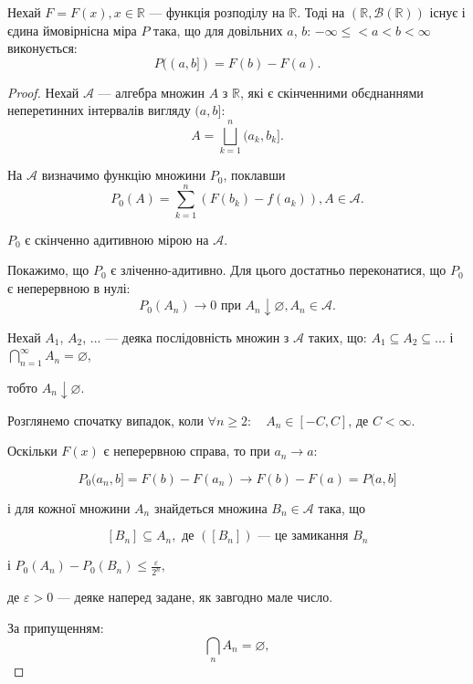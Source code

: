 \begin{theorem}
    Нехай $F = F(x), x \in \mathbb{R}$ --- функція  розподілу на
    $\mathbb{R}$. Тоді на $(\mathbb{R}, \mathcal{B}(\mathbb{R}))$
    існує і єдина ймовірнісна міра $P$ така, що для довільних $a$, $b$:
    $-\infty \leqslant < a < b < \infty$ виконується:
    $$P((a, b]) = F(b) - F(a).$$
\end{theorem}
\begin{proof}
    Нехай $\mathcal{A}$ --- алгебра множин $A$ з $\mathbb{R}$,
    які є скінченними обєднаннями неперетинних інтервалів
    вигляду $(a, b]$:
    $$A = \bigsqcup\limits_{k=1}^n (a_k, b_k].$$
    
    На $\mathcal{A}$ визначимо функцію множини $P_0$, поклавши
    $$P_0(A) = \sum\limits_{k=1}^{n} (F(b_k) - f(a_k)), A \in \mathcal{A}.$$
    
    $P_0$ є скінченно адитивною мірою на $\mathcal{A}$.
    
    Покажимо, що $P_0$ є зліченно-адитивно. Для цього достатньо
    переконатися, що $P_0$ є неперервною в нулі:
    $$P_0(A_n) \rightarrow 0 \text{ при } A_n \downarrow \varnothing, A_n \in \mathcal{A}.$$

        Нехай $A_1$, $A_2$, ... --- деяка послідовність множин з $\mathcal{A}$
    таких, що: $A_1 \subseteq A_2 \subseteq ...$ і
    $\bigcap\limits_{n=1}^{\infty} A_n = \varnothing$,
    
    тобто $A_n \downarrow \varnothing$.
    
    Розглянемо спочатку випадок, коли $\forall n \geqslant 2: \quad A_n \in [-C, C]$,
    де $C < \infty$.
    
    Оскільки $F(x)$ є неперервною справа, то при $a_n \rightarrow a$:
    
    $$P_0(a_n, b] = F(b) - F(a_n) \rightarrow F(b) - F(a) = P(a, b]$$
    
    і для кожної множини $A_n$ знайдеться множина $B_n \in \mathcal{A}$ 
    така, що 
    
    $$[B_n] \subseteq A_n, \text{ де } ([B_n]) \text{ --- це замикання } B_n$$
    
    \beautifulImage
    
    і $P_0(A_n) - P_0(B_n) \leqslant \frac{\varepsilon}{2^n},$
    
    де $\varepsilon > 0$ --- деяке наперед задане, як завгодно мале число. 
    
    За припущенням:
    $$\bigcap\limits_{n} A_n = \varnothing,$$
    

\end{proof}
